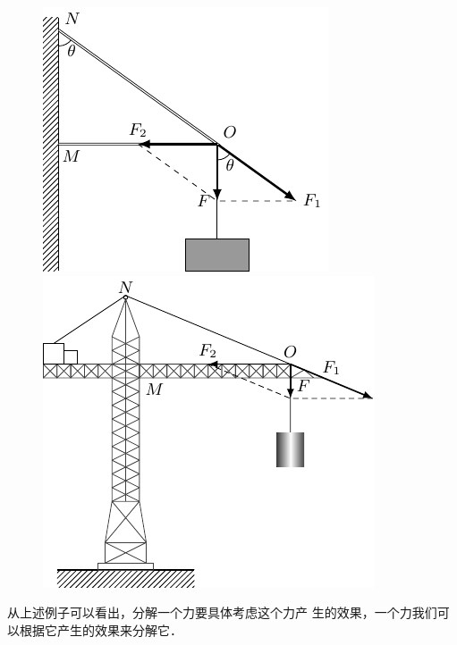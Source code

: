 \begin{figure}[htbp]
    \centering
    \begin{minipage}[t]{0.48\textwidth} 
        \centering
        \includegraphics{fig/A/1-30.pdf} 
        \caption{} \label{fig_A_1-30} 
    \end{minipage} 
    \begin{minipage}[t]{0.48\textwidth} 
        \centering
        \includegraphics{fig/A/1-31.pdf} 
        \caption{} \label{fig_A_1-31} 
    \end{minipage} 
\end{figure} 

    从上述例子可以看出，分解一个力要具体考虑这个力产
生的效果，一个力我们可以根据它产生的效果来分解它．


